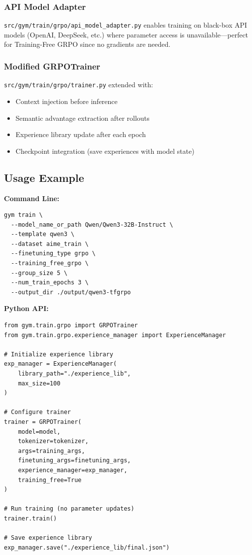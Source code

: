 \subsubsection{API Model Adapter}
\texttt{src/gym/train/grpo/api\_model\_adapter.py} enables training on black-box API models (OpenAI, DeepSeek, etc.) where parameter access is unavailable—perfect for Training-Free GRPO since no gradients are needed.

\subsubsection{Modified GRPOTrainer}
\texttt{src/gym/train/grpo/trainer.py} extended with:
\begin{itemize}
    \item Context injection before inference
    \item Semantic advantage extraction after rollouts
    \item Experience library update after each epoch
    \item Checkpoint integration (save experiences with model state)
\end{itemize}

\subsection{Usage Example}

\textbf{Command Line:}
\begin{verbatim}
gym train \
  --model_name_or_path Qwen/Qwen3-32B-Instruct \
  --template qwen3 \
  --dataset aime_train \
  --finetuning_type grpo \
  --training_free_grpo \
  --group_size 5 \
  --num_train_epochs 3 \
  --output_dir ./output/qwen3-tfgrpo
\end{verbatim}

\textbf{Python API:}
\begin{verbatim}
from gym.train.grpo import GRPOTrainer
from gym.train.grpo.experience_manager import ExperienceManager

# Initialize experience library
exp_manager = ExperienceManager(
    library_path="./experience_lib",
    max_size=100
)

# Configure trainer
trainer = GRPOTrainer(
    model=model,
    tokenizer=tokenizer,
    args=training_args,
    finetuning_args=finetuning_args,
    experience_manager=exp_manager,
    training_free=True
)

# Run training (no parameter updates)
trainer.train()

# Save experience library
exp_manager.save("./experience_lib/final.json")
\end{verbatim}

